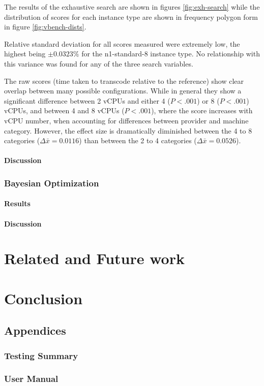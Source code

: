\documentclass{report}
\begin{document}
The results of the exhaustive search are shown in figures \ref{fig:exh-search} while the distribution of scores for each instance type are shown in frequency polygon form in figure \ref{fig:vbench-dists}.

Relative standard deviation for all scores measured were extremely low, the highest being $\pm 0.0323\%$ for the n1-standard-8 instance type. No relationship with this variance was found for any of the three search variables.

The raw scores (time taken to transcode relative to the reference) show clear overlap between many possible configurations. While in general they show a significant difference between 2 vCPUs and either 4 ($P < .001$) or 8 ($P < .001$) vCPUs, and between 4 and 8 vCPUs ($P < .001$), where the score increases with vCPU number, when accounting for differences between provider and machine category. However, the effect size is dramatically diminished between the 4 to 8 categories ($\Delta \bar{x} = 0.0116$) than between the 2 to 4 categories ($\Delta \bar{x} = 0.0526$).


\subsubsection{Discussion}
\subsection{Bayesian Optimization}
\subsubsection{Results}
\subsubsection{Discussion}
\chapter{Related and Future work}
\chapter{Conclusion}

\newpage


\newpage
\section*{Appendices}
\subsection*{Testing Summary}
\subsection*{User Manual}
\end{document}
